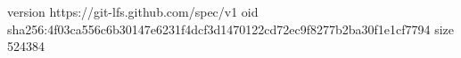 version https://git-lfs.github.com/spec/v1
oid sha256:4f03ca556c6b30147e6231f4dcf3d1470122cd72ec9f8277b2ba30f1e1cf7794
size 524384
